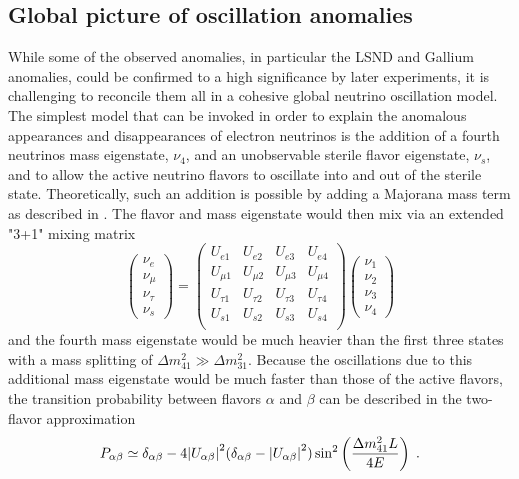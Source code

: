 \subsection{Global picture of oscillation anomalies}
\label{sec:global-anomalies}
While some of the observed anomalies, in particular the LSND and Gallium anomalies, could be confirmed to a high significance by later experiments, it is challenging to reconcile them all in a cohesive global neutrino oscillation model.
The simplest model that can be invoked in order to explain the anomalous appearances and disappearances of electron neutrinos is the addition of a fourth neutrinos mass eigenstate, $\nu_4$, and an unobservable sterile flavor eigenstate, $\nu_s$, and to allow the active neutrino flavors to oscillate into and out of the sterile state.
Theoretically, such an addition is possible by adding a Majorana mass term as described in .
The flavor and mass eigenstate would then mix via an extended "3+1" mixing matrix
\begin{equation}
    \begin{pmatrix}
        \nu_e \\ \nu_\mu \\ \nu_\tau \\ \nu_s
    \end{pmatrix}
    =
    \begin{pmatrix}
    U_{e1}    & U_{e2}    & U_{e3}   &U_{e4}    \\
    U_{\mu1}  & U_{\mu2}  & U_{\mu3} &U_{\mu4}  \\
    U_{\tau1} & U_{\tau2} & U_{\tau3}&U_{\tau4} \\
    U_{s1} & U_{s2} & U_{s3}&U_{s4} \\
    \end{pmatrix}
    \begin{pmatrix}
        \nu_1 \\ \nu_2 \\ \nu_3 \\ \nu_4
    \end{pmatrix}
\end{equation}
and the fourth mass eigenstate would be much heavier than the first three states with a mass splitting of $\Delta m^2_{41} \gg \Delta m^2_{31}$.
Because the oscillations due to this additional mass eigenstate would be much faster than those of the active flavors, the transition probability between flavors $\alpha$ and $\beta$ can be described in the two-flavor approximation
\begin{equation}
    P_{\alpha\beta}\simeq \delta_{\alpha\beta} - 4\abs{U_{\alpha\beta}}^2(\delta_{\alpha\beta}-\abs{U_{\alpha\beta}}^2)\sin^2\left(\frac{\Delta m^2_{41}L}{4E}\right)\;.
\end{equation}
